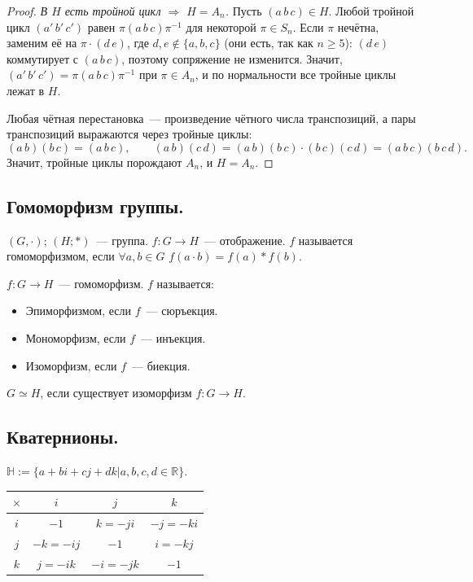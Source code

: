 \documentclass[12pt]{article}
\begin{document}
\begin{proof}
		\emph{В $H$ есть тройной цикл $\Rightarrow$ $H = A_n$.} Пусть $(a\,b\,c) \in H$. Любой тройной цикл $(a'\,b'\,c')$ равен $\pi (a\,b\,c) \pi^{-1}$ для некоторой $\pi \in S_n$. Если $\pi$ нечётна, заменим её на $\pi \cdot (d\,e)$, где $d, e \notin \{a, b, c\}$ (они есть, так как $n \geqslant 5$): $(d\,e)$ коммутирует с $(a\,b\,c)$, поэтому сопряжение не изменится. Значит, $(a'\,b'\,c') = \pi(a\,b\,c)\pi^{-1}$ при $\pi \in A_n$, и по нормальности все тройные циклы лежат в $H$.

		Любая чётная перестановка~--- произведение чётного числа транспозиций, а пары транспозиций выражаются через тройные циклы:
		\[
			(a\,b)(b\,c) = (a\,b\,c), \qquad (a\,b)(c\,d) = (a\,b)(b\,c) \cdot (b\,c)(c\,d) = (a\,b\,c)(b\,c\,d).
		\]
		Значит, тройные циклы порождают $A_n$, и $H = A_n$.
	\end{proof}
	\subsection{Гомоморфизм группы.}
	\begin{definition}
		$(G, \cdot)$; $(H; *)$~--- группа. $f: G \rightarrow H$~--- отображение. $f$ называется гомоморфизмом, если $\forall a, b \in G$ $f(a \cdot b) = f(a) * f(b)$.
	\end{definition}
	\begin{definition}
		$f: G \rightarrow H$~--- гомоморфизм. $f$ называется:
		\begin{itemize}
			\item Эпиморфизмом, если $f$~--- сюръекция.
			\item Мономорфизм, если $f$~--- инъекция.
			\item Изоморфизм, если $f$~--- биекция.
		\end{itemize}
		$G \simeq H$, если существует изоморфизм $f: G \rightarrow H$.
	\end{definition}
	\subsection{Кватернионы.}
	$\mathbb{H} := \{ a + bi + cj + dk | a, b, c, d \in \mathbb{R} \}$.
	\begin{xltabular}{\textwidth}{|c|c|c|c|}
		\hline
		$\times$ & $i$ & $j$ & $k$\\
		\hline
		$i$ & $-1$ & $k = -ji$ & $-j = -ki$\\
		\hline
		$j$ & $-k = -ij$ & $-1$ & $i = -kj$\\
		\hline
		$k$ & $j = -ik$ & $-i = -jk$ & $-1$\\
		\hline
	\end{xltabular}
\end{document}
